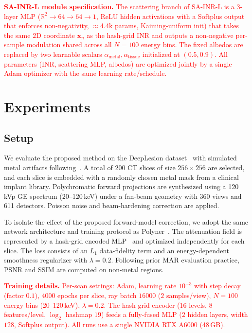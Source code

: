 \documentclass[journal]{IEEEtran}
\newcommand{\vx}{\mathbf{x}}
\newcommand{\new}[1]{\textcolor{red}{#1}}  %
\def\ourmodel{SA-INR}
\begin{document}
\new{\textbf{SA-INR-L module specification.} The scattering branch of \ourmodel-L is a 3-layer MLP ($\mathbb{R}^2\!\rightarrow\!64\!\rightarrow\!64\!\rightarrow\!1$, ReLU hidden activations with a Softplus output that enforces non-negativity, $\approx$4.4k params, Kaiming-uniform init) that takes the same 2D coordinate $\vx_n$ as the hash-grid INR and outputs a non-negative per-sample modulation shared across all $N{=}100$ energy bins. The fixed albedos are replaced by two learnable scalars $\alpha_{\text{metal}},\alpha_{\text{tissue}}$ initialized at $(0.5,0.9)$. All parameters (INR, scattering MLP, albedos) are optimized jointly by a single Adam optimizer with the same learning rate/schedule.}

\section{Experiments}
\subsection{Setup}
We evaluate the proposed method on the DeepLesion dataset~\cite{yan2018deeplesion} with simulated metal artifacts following~\cite{wu2023unsupervised}. A total of 200 CT slices of size $256\times256$ are selected, and each slice is embedded with a randomly chosen metal mask from a clinical implant library. Polychromatic forward projections are synthesized using a 120\,kVp GE spectrum (20--120\,keV) under a fan-beam geometry with 360 views and 611 detectors. Poisson noise and beam-hardening correction are applied.

To isolate the effect of the proposed forward-model correction, we adopt the same network architecture and training protocol as Polyner~\cite{wu2023unsupervised}. The attenuation field is represented by a hash-grid encoded MLP~\cite{muller2022instant} and optimized independently for each slice. The loss consists of an $L_1$ data-fidelity term and an energy-dependent smoothness regularizer with $\lambda=0.2$. Following prior MAR evaluation practice, PSNR and SSIM are computed on non-metal regions.

\new{\textbf{Training details.} Per-scan settings: Adam, learning rate $10^{-3}$ with step decay (factor $0.1$), $4000$ epochs per slice, ray batch $16000$ ($2$ samples/view), $N{=}100$ energy bins (20--120\,keV), $\lambda{=}0.2$. The hash-grid encoder ($16$ levels, $8$ features/level, $\log_2$ hashmap $19$) feeds a fully-fused MLP ($2$ hidden layers, width $128$, Softplus output). All runs use a single NVIDIA RTX A6000 (48\,GB).}
\end{document}
